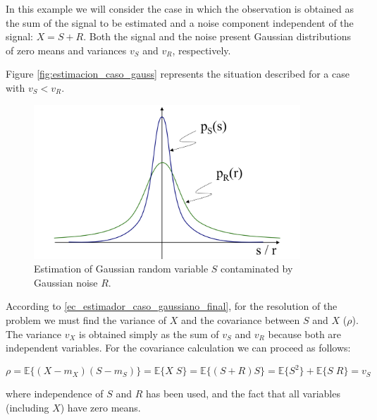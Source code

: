 \begin{example}
\label{ex:senialenruido}

In this example we will consider the case in which the observation is obtained as the sum of the signal to be estimated and a noise component independent of the signal: $X = S + R$. Both the signal and the noise present Gaussian distributions of zero means and variances $v_S$ and $v_R$, respectively.

Figure \eqref{fig:estimacion_caso_gauss} represents the situation described for a case with $v_S < v_R$.
\begin{figure}[htb]
  \begin{center}
  \includegraphics[width=10cm]{Figures//estimacion_caso_gauss.png}
    \caption{Estimation of Gaussian random variable $S$ contaminated by Gaussian noise $R$.}
    \label{fig:estimacion_caso_gauss}
  \end{center}
\end{figure}
\end{example}\vspace{0.4cm}

According to \eqref{ec_estimador_caso_gaussiano_final}, for the resolution of the problem we must find the variance of $X$ and the covariance between $S$ and $X$ ($\rho$). The variance $v_X$ is obtained simply as the sum of $v_S$ and $v_R$ because both are independent variables. For the covariance calculation we can proceed as follows:

\begin{equation}
\rho = \mathbb{E} \{(X-m_X)(S-m_S)\} = \mathbb{E} \{X\;S\} = \mathbb{E} \{(S + R) S\} = \mathbb{E} \{S^2\} + \mathbb{E} \{S\;R\} = v_S
\end{equation}

where independence of $S$ and $R$ has been used, and the fact that all variables (including $X$) have zero means.

